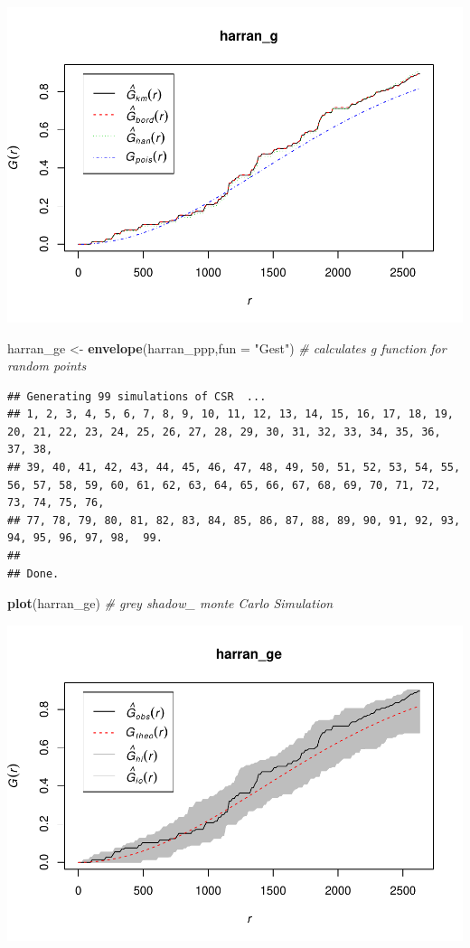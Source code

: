 \documentclass[]{article}
\newenvironment{Shaded}{\begin{snugshade}}{\end{snugshade}}
\newcommand{\KeywordTok}[1]{\textcolor[rgb]{0.13,0.29,0.53}{\textbf{{#1}}}}
\newcommand{\DataTypeTok}[1]{\textcolor[rgb]{0.13,0.29,0.53}{{#1}}}
\newcommand{\StringTok}[1]{\textcolor[rgb]{0.31,0.60,0.02}{{#1}}}
\newcommand{\CommentTok}[1]{\textcolor[rgb]{0.56,0.35,0.01}{\textit{{#1}}}}
\newcommand{\NormalTok}[1]{{#1}}
\begin{document}
\includegraphics{HarranPlain_files/figure-latex/unnamed-chunk-9-1.pdf}

\begin{Shaded}
\begin{Highlighting}[]
\NormalTok{harran_ge <-}\StringTok{ }\KeywordTok{envelope}\NormalTok{(harran_ppp,}\DataTypeTok{fun =} \StringTok{"Gest"}\NormalTok{) }\CommentTok{# calculates g function for random points}
\end{Highlighting}
\end{Shaded}

\begin{verbatim}
## Generating 99 simulations of CSR  ...
## 1, 2, 3, 4, 5, 6, 7, 8, 9, 10, 11, 12, 13, 14, 15, 16, 17, 18, 19, 20, 21, 22, 23, 24, 25, 26, 27, 28, 29, 30, 31, 32, 33, 34, 35, 36, 37, 38,
## 39, 40, 41, 42, 43, 44, 45, 46, 47, 48, 49, 50, 51, 52, 53, 54, 55, 56, 57, 58, 59, 60, 61, 62, 63, 64, 65, 66, 67, 68, 69, 70, 71, 72, 73, 74, 75, 76,
## 77, 78, 79, 80, 81, 82, 83, 84, 85, 86, 87, 88, 89, 90, 91, 92, 93, 94, 95, 96, 97, 98,  99.
## 
## Done.
\end{verbatim}

\begin{Shaded}
\begin{Highlighting}[]
\KeywordTok{plot}\NormalTok{(harran_ge) }\CommentTok{# grey shadow_ monte Carlo Simulation}
\end{Highlighting}
\end{Shaded}

\includegraphics{HarranPlain_files/figure-latex/unnamed-chunk-9-2.pdf}
\end{document}
